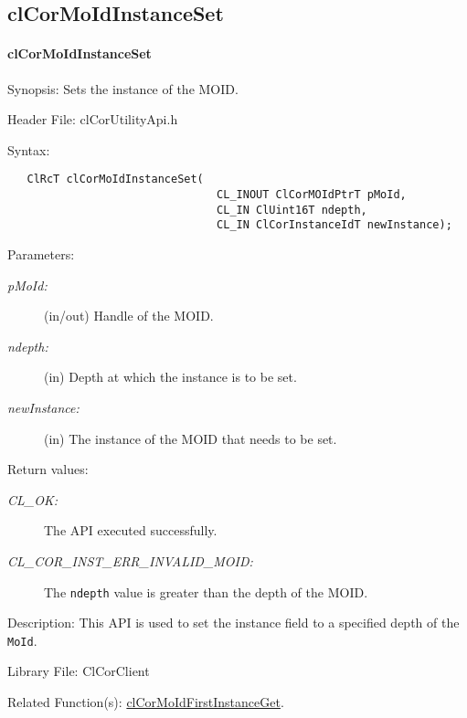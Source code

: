 \begin{flushleft}
\subsection{clCorMoIdInstanceSet}
\hypertarget{pagecor131}{}\paragraph{cl\-Cor\-MoId\-Instance\-Set}\label{pagecor131}
\begin{Desc}
\item[Synopsis:]Sets the instance of the MOID.\end{Desc}
\begin{Desc}
\item[Header File:]clCorUtilityApi.h\end{Desc}
\begin{Desc}
\item[Syntax:]

\footnotesize\begin{verbatim}   ClRcT clCorMoIdInstanceSet(
                         		CL_INOUT ClCorMOIdPtrT pMoId,
                         		CL_IN ClUint16T ndepth,
                         		CL_IN ClCorInstanceIdT newInstance);
\end{verbatim}
\normalsize
\end{Desc}
\begin{Desc}
\item[Parameters:]
\begin{description}
\item[{\em p\-MoId:}](in/out) Handle of the MOID. \item[{\em ndepth:}](in) Depth at which the instance is to be set. 
\item[{\em new\-Instance:}](in) The instance of the MOID that needs to be set.\end{description}
\end{Desc}
\begin{Desc}
\item[Return values:]
\begin{description}
\item[{\em CL\_\-OK:}]The API executed successfully.
\item[{\em CL\_\-COR\_\-INST\_\-ERR\_\-INVALID\_\-MOID:}] The {\tt{ndepth}} value is greater than the depth of the MOID. 
\end{description}
\end{Desc}
\begin{Desc}
\item[Description:]This API is used to set the instance field to a specified depth of the {\tt{MoId}}.\end{Desc}
\begin{Desc}
\item[Library File:]Cl\-Cor\-Client\end{Desc}
\begin{Desc}
\item[Related Function(s):]\hyperlink{pagecor123}{cl\-Cor\-MoId\-First\-Instance\-Get}. \end{Desc}
\newpage



\end{flushleft}
